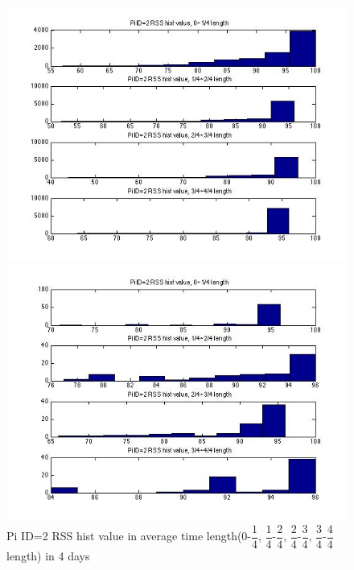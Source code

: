 \documentclass[10pt,conference]{IEEEtran}
\begin{document}
\begin{figure}[htbp]
\begin{minipage}[t]{0.2\textwidth}
	\centering
	\includegraphics[scale=0.2]{time2-3}
\end{minipage}
\begin{minipage}[t]{0.2\textwidth}
	\centering
	\includegraphics[scale=0.2]{time2-4}
\end{minipage}
\caption{Pi ID=2 RSS hist value in average time length(0-$\dfrac{1}{4}$, $\dfrac{1}{4}$-$\dfrac{2}{4}$, $\dfrac{2}{4}$-$\dfrac{3}{4}$, $\dfrac{3}{4}$-$\dfrac{4}{4}$ length) in 4 days}\label{hist4}
\end{figure}
\end{document}
